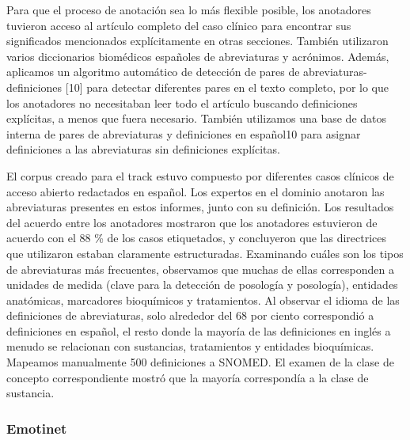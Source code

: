 Para que el proceso de anotación sea lo más flexible posible, los anotadores tuvieron acceso al artículo completo del caso clínico para encontrar sus significados mencionados explícitamente en otras secciones. También utilizaron varios diccionarios biomédicos españoles de abreviaturas y acrónimos. Además, aplicamos un algoritmo automático de detección de pares de abreviaturas-definiciones [10] para detectar diferentes pares en el texto completo, por lo que los anotadores no necesitaban leer todo el artículo buscando definiciones explícitas, a menos que fuera necesario. También utilizamos una base de datos interna de pares de abreviaturas y definiciones en español10 para asignar definiciones a las abreviaturas sin definiciones explícitas.

El corpus creado para el track estuvo compuesto por diferentes casos clínicos de acceso abierto redactados en español. Los expertos en el dominio anotaron las abreviaturas presentes en estos informes, junto con su definición. Los resultados del acuerdo entre los anotadores mostraron que los anotadores estuvieron de acuerdo con el 88 \% de los casos etiquetados, y concluyeron que las directrices que utilizaron estaban claramente estructuradas. Examinando cuáles son los tipos de abreviaturas más frecuentes, observamos que muchas de ellas corresponden a unidades de medida (clave para la detección de posología y posología), entidades anatómicas, marcadores bioquímicos y tratamientos. Al observar el idioma de las definiciones de abreviaturas, solo alrededor del 68 por ciento correspondió a definiciones en español, el resto donde la mayoría de las definiciones en inglés a menudo se relacionan con sustancias, tratamientos y entidades bioquímicas. Mapeamos manualmente 500 definiciones a SNOMED. El examen de la clase de concepto correspondiente mostró que la mayoría correspondía a la clase de sustancia.

\subsubsection*{Emotinet}

